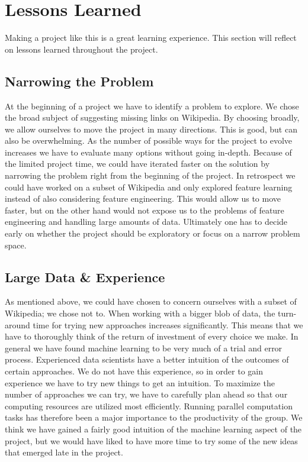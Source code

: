 \section{Lessons Learned}
Making a project like this is a great learning experience. This section will reflect on lessons learned throughout the project.

\subsection{Narrowing the Problem}
At the beginning of a project we have to identify a problem to explore. We chose the broad subject of suggesting missing links on Wikipedia. By choosing broadly, we allow ourselves to move the project in many directions. This is good, but can also be overwhelming. As the number of possible ways for the project to evolve increases we have to evaluate many options without going in-depth. Because of the limited project time, we could have iterated faster on the solution by narrowing the problem right from the beginning of the project. In retrospect we could have worked on a subset of Wikipedia and only explored feature learning instead of also considering feature engineering. This would allow us to move faster, but on the other hand would not expose us to the problems of feature engineering and handling large amounts of data. Ultimately one has to decide early on whether the project should be exploratory or focus on a narrow problem space.

\subsection{Large Data \& Experience}
As mentioned above, we could have chosen to concern ourselves with a subset of Wikipedia; we chose not to. When working with a bigger blob of data, the turn-around time for trying new approaches increases significantly. This means that we have to thoroughly think of the return of investment of every choice we make. In general we have found machine learning to be very much of a trial and error process. Experienced data scientists have a better intuition of the outcomes of certain approaches. We do not have this experience, so in order to gain experience we have to try new things to get an intuition. To maximize the number of approaches we can try, we have to carefully plan ahead so that our computing resources are utilized most efficiently. Running parallel computation tasks has therefore been a major importance to the productivity of the group. We think we have gained a fairly good intuition of the machine learning aspect of the project, but we would have liked to have more time to try some of the new ideas that emerged late in the project.

